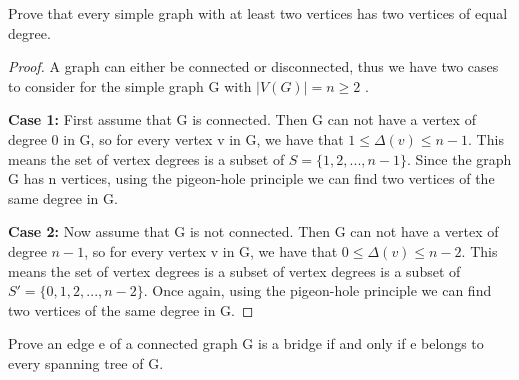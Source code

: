 \documentclass[10pt]{article}
\renewcommand{\qedsymbol}{}
\newenvironment{problem}[2][Problem]{\begin{trivlist}
		\item[\hskip \labelsep {\bfseries #1}\hskip \labelsep {\bfseries #2.}]}{\end{trivlist}}
\begin{document}
	\vspace{0.15in} %
	
	\begin{problem}{3}
		Prove that every simple graph with at least two vertices has two vertices of equal degree. 
	\end{problem}
    
    \begin{proof}\quad\newline%
   A graph can either be connected or disconnected, thus we have two cases to consider for the simple graph G with $|V(G)| = n \geq 2$ . 
  
\textbf{Case 1:} First assume that G is connected. Then G can not have a vertex of degree 0 in G, so for every vertex v in G, we have that $1 \leq \Delta (v) \leq n- 1$. This means the set of vertex degrees is a subset of $S = \{1, 2, ... , n - 1\}$. Since the graph G has n vertices, using the  pigeon-hole principle we can find two vertices of the same degree in G.

\textbf{Case 2:} Now assume that G is not connected. Then G can not have a vertex of degree $n - 1$, so for every vertex v in G, we have that $0 \leq \Delta (v) \leq n- 2$. This means the set of vertex degrees is a subset of vertex degrees is a subset of $S' = \{0, 1, 2, ..., n - 2\}$. Once again, using the pigeon-hole principle we can find two vertices of the same degree in G. \renewcommand{\qedsymbol}{$\blacksquare$}
    \end{proof}
	
	
	
	\vspace{0.25in} %
	
	\begin{problem}{4}
		Prove an edge e of a connected graph G is a bridge if and only if e belongs to every spanning tree of G. 
	\end{problem}
	
\end{document}
